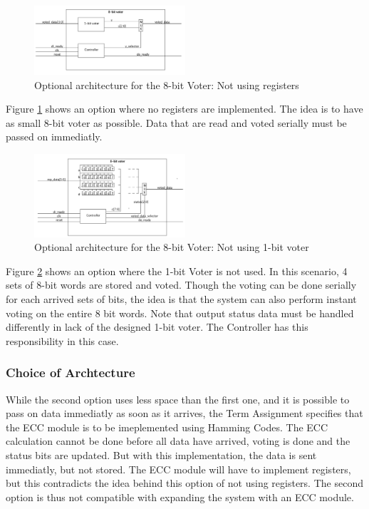 \documentclass[a4paper]{IEEEtran}
\begin{document}
\begin{figure}[h!]
    \centering
    \includegraphics[width=0.5\textwidth]{Figures/Solution/ArchitectureOption2}
    \caption{Optional architecture for the 8-bit Voter: Not using registers}
    \label{fig:ArchitectureOption2}
\end{figure}
Figure \ref{fig:ArchitectureOption2} shows an option where no registers are implemented. 
The idea is to have as small 8-bit voter as possible. 
Data that are read and voted serially must be passed on immediatly.

\begin{figure}[h!]
    \centering
    \includegraphics[width=0.5\textwidth]{Figures/Solution/ArchitectureOption3}
    \caption{Optional architecture for the 8-bit Voter: Not using 1-bit voter}
    \label{fig:ArchitectureOption3}
\end{figure}
Figure \ref{fig:ArchitectureOption3} shows an option where the 1-bit Voter is not used. In this scenario, 4 sets of 8-bit words are stored and voted.
Though the voting can be done serially for each arrived sets of bits, the idea is that the system can also perform instant voting on the entire 8 bit words.
Note that output status data must be handled differently in lack of the designed 1-bit voter.
The Controller has this responsibility in this case.

\subsubsection{Choice of Archtecture}
While the second option uses less space than the first one, and it is possible to pass on data immediatly as soon as it arrives, the Term Assignment\protect\cite{assignment-text} specifies that the ECC module is to be imeplemented using Hamming Codes.
The ECC calculation cannot be done before all data have arrived, voting is done and the status bits are updated.
But with this implementation, the data is sent immediatly, but not stored.
The ECC module will have to implement registers, but this contradicts the idea behind this option of not using registers.
The second option is thus not compatible with expanding the system with an ECC module.
\end{document}
